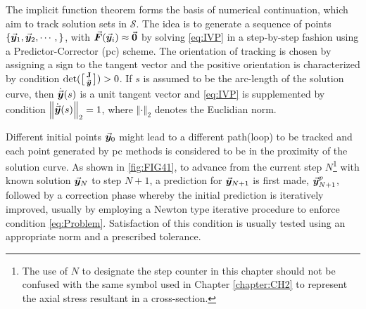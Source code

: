The implicit function theorem forms the basis of numerical
continuation\cite{Allgower:2003,Rheinboldt75,Rheinboldt:2000,Rheinboldt:1980,
Garcia:1980,Watson86,Keller:1978}, which aim to track solution sets in 
$\mathcal{S}$. The idea is to generate a sequence of points
$\{\vec{\bm{y}}_1,\vec{\bm{y}}_2,\cdots,\}$, with 
$\vec{\bm{F}}(\vec{\bm{y}}_i)\approx\vec{\bm{0}}$  by solving
\ref{eq:IVP} in a step-by-step fashion using a Predictor-Corrector 
(\acrshort{pc}) scheme. The orientation of tracking is chosen by assigning a 
sign to the tangent vector and the positive orientation is
characterized by condition $\text{det}(\bigl[
\begin{smallmatrix}
	\mathbf{J} \\ \dot{\vec{\bm{y}}}
\end{smallmatrix}
\bigr]) > 0$. If $s$ is assumed to be the arc-length of the solution curve, then
$\dot{\vec{\bm{y}}}(s)$ is a unit tangent vector and \ref{eq:IVP} is supplemented by
condition $\left\Vert \dot{\vec{\bm{y}}}(s)\right\Vert_2=1$, where $\left\Vert
\cdot\right\Vert_2$ denotes the Euclidian norm.

Different initial points $\vec{\bm{y}}_0$ might
lead to a different path(loop) to be tracked and each point generated by 
\acrshort{pc} methods is considered to be in the proximity of the solution 
curve. As shown in \ref{fig:FIG41}, to advance from the
current step $N$\footnote{The use of $N$ to designate the step counter in this 
chapter should not be confused with the same symbol used in Chapter 
\ref{chapter:CH2} to represent the axial stress resultant in a cross-section.} 
with known solution $\vec{\bm{y}}_N$ to step $N+1$, a
prediction for $\vec{\bm{y}}_{N+1}$ is first made, $\vec{\bm{y}}_{N+1}^p$, followed by 
a 
correction phase 
whereby the initial prediction is iteratively improved, usually by employing a
Newton type iterative procedure to enforce condition \ref{eq:Problem}. 
Satisfaction of
this condition is usually tested using an appropriate norm and a
prescribed tolerance. 

